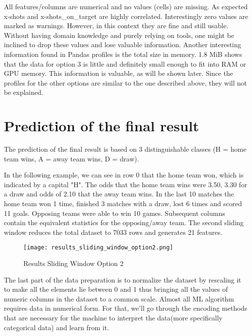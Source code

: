All features/columns are numerical and no values (cells) are missing. As expected x-shots and x-shots\_on\_target are highly 
correlated. Interestingly zero values are marked as warnings. However, in this context they are fine and still usable. Without having domain knowledge and purely relying on tools, one might be inclined to drop these values and lose valuable information. Another interesting information found in Pandas profiles is the total size in memory. 1.8 MiB shows that the data for option 3 is little and definitely small enough to fit into RAM or GPU memory. This information is valuable, as will be shown later.
\newline
Since the profiles for the other options are similar to the one described above, they will not be explained.


\section {Prediction of the final result}

The prediction of the final result is based on 3 distinguishable classes (H = home team wins, A = away team wins, D = draw).

In the following example, we can see in row 0 that the home team won, which is indicated by a capital "H". The odds that the home team wins were 3.50, 3.30 for a draw and odds of 2.10 that the away team wins. In the last 10 matches the home team won 1 time, finished 3 matches with a draw, lost 6 times and scored 11 goals. Opposing teams were able to win 10 games. Subsequent columns contain the equivalent statistics for the opposing/away team. The second sliding window reduces the total dataset to 7033 rows and generates 21 features.


\begin{figure}[H]
\begin{center}
\texttt{[image: results\_sliding\_window\_option2.png]}
\end{center}
\caption{Results Sliding Window Option 2}
\label{fig:sliding_window_option1}
\end{figure}

The last part of the data preparation is to normalize the dataset by rescaling it to make all the elements lie between 0 and 1 thus bringing all the values of numeric columns in the dataset to a common scale. Almost all ML algorithm requires data in numerical form. For that, we'll go through the encoding methods that are necessary for the machine to interpret the data(more specifically categorical data) and learn from it.

